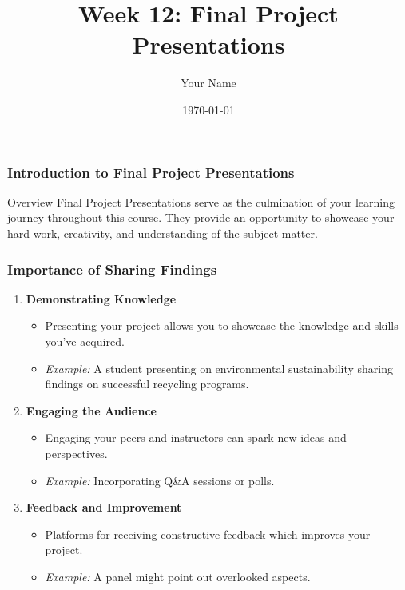 \documentclass{beamer}
\title{Week 12: Final Project Presentations}
\author{Your Name}
\institute{Your Institution}
\date{\today}
\begin{document}
\frame{\titlepage}

\begin{frame}[fragile]
    \frametitle{Introduction to Final Project Presentations}
    \begin{block}{Overview}
        Final Project Presentations serve as the culmination of your learning journey throughout this course. 
        They provide an opportunity to showcase your hard work, creativity, and understanding of the subject matter.
    \end{block}
\end{frame}

\begin{frame}[fragile]
    \frametitle{Importance of Sharing Findings}
    \begin{enumerate}
        \item \textbf{Demonstrating Knowledge}
            \begin{itemize}
                \item Presenting your project allows you to showcase the knowledge and skills you've acquired.
                \item \textit{Example:} A student presenting on environmental sustainability sharing findings on successful recycling programs.
            \end{itemize}
        
        \item \textbf{Engaging the Audience}
            \begin{itemize}
                \item Engaging your peers and instructors can spark new ideas and perspectives.
                \item \textit{Example:} Incorporating Q\&A sessions or polls.
            \end{itemize}

        \item \textbf{Feedback and Improvement}
            \begin{itemize}
                \item Platforms for receiving constructive feedback which improves your project.
                \item \textit{Example:} A panel might point out overlooked aspects.
            \end{itemize}
    \end{enumerate}
\end{frame}
\end{document}
